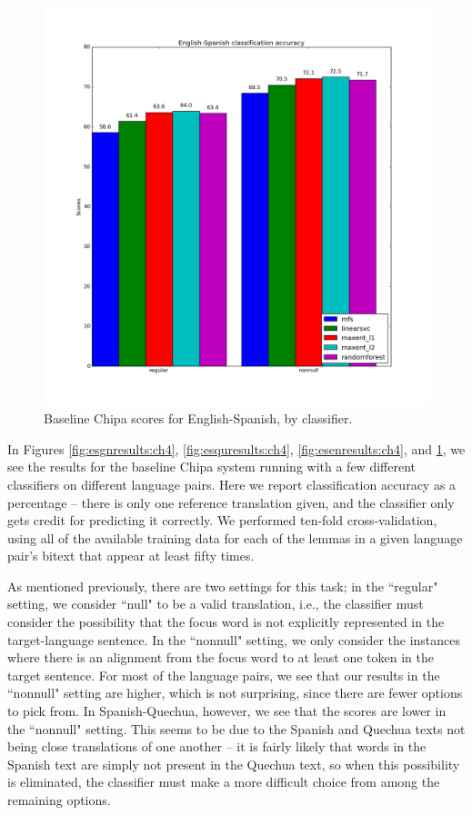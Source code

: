 \begin{figure}
  \includegraphics[width=\textwidth]{baseline-enes-ch4.png}
  \caption{Baseline Chipa scores for English-Spanish, by classifier.}
  \label{fig:enesresults:ch4}
\end{figure}

In Figures \ref{fig:esgnresults:ch4}, \ref{fig:esquresults:ch4},
\ref{fig:esenresults:ch4}, and \ref{fig:enesresults:ch4}, we see the results
for the baseline Chipa system running with a few different classifiers on
different language pairs. Here we report classification accuracy as a
percentage -- there is only one reference translation given, and the classifier
only gets credit for predicting it correctly. We performed ten-fold
cross-validation, using all of the available training data for each of the
lemmas in a given language pair's bitext that appear at least fifty times. 

As mentioned previously, there are two settings for this task; in the
``regular" setting, we consider ``null" to be a valid translation, i.e., the
classifier must consider the possibility that the focus word is not explicitly
represented in the target-language sentence. In the ``nonnull" setting, we only
consider the instances where there is an alignment from the focus word to at
least one token in the target sentence. For most of the language pairs, we see
that our results in the ``nonnull" setting are higher, which is not surprising,
since there are fewer options to pick from. In Spanish-Quechua, however, we see
that the scores are lower in the ``nonnull" setting. This seems to be due to
the Spanish and Quechua texts not being close translations of one another -- it
is fairly likely that words in the Spanish text are simply not present in the
Quechua text, so when this possibility is eliminated, the classifier must make
a more difficult choice from among the remaining options.

